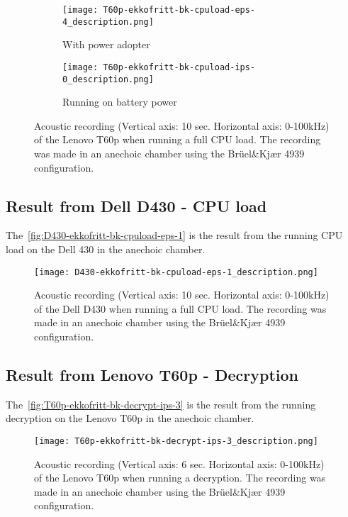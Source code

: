 \begin{figure}[ht]
	\begin{subfigure}{1\textwidth}
	    \centering
	    \texttt{[image: T60p-ekkofritt-bk-cpuload-eps-4\_description.png]}
	    \caption{With power adopter}
	    \label{fig:T60p-ekkofritt-bk-cpuload-eps-4}
    \end{subfigure}
    \begin{subfigure}{1\textwidth}
	    \centering
	    \texttt{[image: T60p-ekkofritt-bk-cpuload-ips-0\_description.png]}
	    \caption{Running on battery power}
	    \label{fig:T60p-ekkofritt-bk-cpuload-ips-0}
    \end{subfigure}
    \caption{Acoustic recording (Vertical axis: 10 sec. Horizontal axis: 0-100kHz) of the Lenovo T60p when running a full CPU load. The recording was made in an anechoic chamber using the Brüel\&Kjær 4939 configuration.}
	\label{fig:T60p-ekkofritt-bk-cpuload}
\end{figure}


\subsection{Result from Dell D430 - CPU load}\label{chp5:subsec:d430_bk_results_cpuload}

The~\autoref{fig:D430-ekkofritt-bk-cpuload-eps-1} is the result from the running CPU load on the Dell 430 in the anechoic chamber. 
\begin{figure}[ht]
    \centering
    \texttt{[image: D430-ekkofritt-bk-cpuload-eps-1\_description.png]}
    \caption{Acoustic recording (Vertical axis: 10 sec. Horizontal axis: 0-100kHz) of the Dell D430 when running a full CPU load. The recording was made in an anechoic chamber using the Brüel\&Kjær 4939 configuration. }
    \label{fig:D430-ekkofritt-bk-cpuload-eps-1}
\end{figure}


\subsection{Result from Lenovo T60p - Decryption}\label{chp5:subsec:t60p_bk_results_decryption}

The~\autoref{fig:T60p-ekkofritt-bk-decrypt-ips-3} is the result from the running decryption on the Lenovo T60p in the anechoic chamber. 
\begin{figure}[ht]
    \centering
    \texttt{[image: T60p-ekkofritt-bk-decrypt-ips-3\_description.png]}
    \caption{Acoustic recording (Vertical axis: 6 sec. Horizontal axis: 0-100kHz) of the Lenovo T60p when running a decryption. The recording was made in an anechoic chamber using the Brüel\&Kjær 4939 configuration. }
    \label{fig:T60p-ekkofritt-bk-decrypt-ips-3}
\end{figure}


